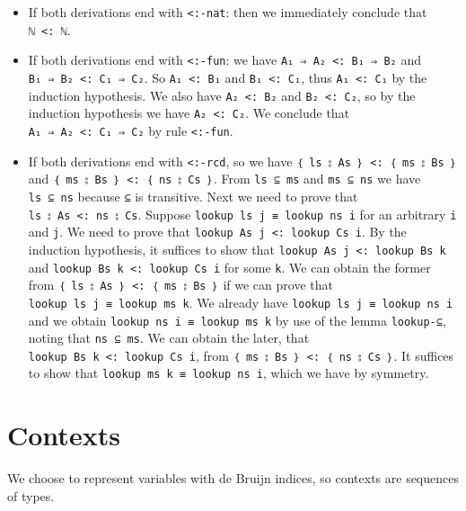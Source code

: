 \begin{itemize}
\item
  If both derivations end with \texttt{\textless{}:-nat}: then we
  immediately conclude that \texttt{ℕ\ \textless{}:\ ℕ}.
\item
  If both derivations end with \texttt{\textless{}:-fun}: we have
  \texttt{A₁\ ⇒\ A₂\ \textless{}:\ B₁\ ⇒\ B₂} and
  \texttt{B₁\ ⇒\ B₂\ \textless{}:\ C₁\ ⇒\ C₂}. So
  \texttt{A₁\ \textless{}:\ B₁} and \texttt{B₁\ \textless{}:\ C₁}, thus
  \texttt{A₁\ \textless{}:\ C₁} by the induction hypothesis. We also
  have \texttt{A₂\ \textless{}:\ B₂} and \texttt{B₂\ \textless{}:\ C₂},
  so by the induction hypothesis we have \texttt{A₂\ \textless{}:\ C₂}.
  We conclude that \texttt{A₁\ ⇒\ A₂\ \textless{}:\ C₁\ ⇒\ C₂} by rule
  \texttt{\textless{}:-fun}.
\item
  If both derivations end with \texttt{\textless{}:-rcd}, so we have
  \texttt{｛\ ls\ ⦂\ As\ ｝\ \textless{}:\ ｛\ ms\ ⦂\ Bs\ ｝} and
  \texttt{｛\ ms\ ⦂\ Bs\ ｝\ \textless{}:\ ｛\ ns\ ⦂\ Cs\ ｝}. From
  \texttt{ls\ ⊆\ ms} and \texttt{ms\ ⊆\ ns} we have \texttt{ls\ ⊆\ ns}
  because \texttt{⊆} is transitive. Next we need to prove that
  \texttt{ls\ ⦂\ As\ \textless{}:\ ns\ ⦂\ Cs}. Suppose
  \texttt{lookup\ ls\ j\ ≡\ lookup\ ns\ i} for an arbitrary \texttt{i}
  and \texttt{j}. We need to prove that
  \texttt{lookup\ As\ j\ \textless{}:\ lookup\ Cs\ i}. By the induction
  hypothesis, it suffices to show that
  \texttt{lookup\ As\ j\ \textless{}:\ lookup\ Bs\ k} and
  \texttt{lookup\ Bs\ k\ \textless{}:\ lookup\ Cs\ i} for some
  \texttt{k}. We can obtain the former from
  \texttt{｛\ ls\ ⦂\ As\ ｝\ \textless{}:\ ｛\ ms\ ⦂\ Bs\ ｝} if we can
  prove that \texttt{lookup\ ls\ j\ ≡\ lookup\ ms\ k}. We already have
  \texttt{lookup\ ls\ j\ ≡\ lookup\ ns\ i} and we obtain
  \texttt{lookup\ ns\ i\ ≡\ lookup\ ms\ k} by use of the lemma
  \texttt{lookup-⊆}, noting that \texttt{ns\ ⊆\ ms}. We can obtain the
  later, that \texttt{lookup\ Bs\ k\ \textless{}:\ lookup\ Cs\ i}, from
  \texttt{｛\ ms\ ⦂\ Bs\ ｝\ \textless{}:\ ｛\ ns\ ⦂\ Cs\ ｝}. It
  suffices to show that \texttt{lookup\ ms\ k\ ≡\ lookup\ ns\ i}, which
  we have by symmetry.
\end{itemize}

\hypertarget{contexts}{%
\section{Contexts}\label{contexts}}

We choose to represent variables with de Bruijn indices, so contexts are
sequences of types.

